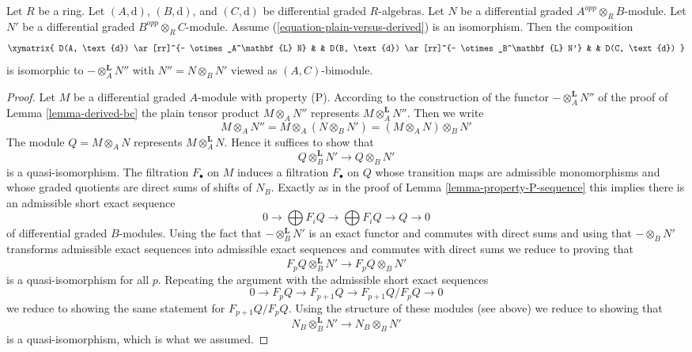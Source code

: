 \begin{lemma}
\label{lemma-compose-tensor-functors-general}
Let $R$ be a ring. Let $(A, \text{d})$, $(B, \text{d})$, and
$(C, \text{d})$ be differential graded $R$-algebras.
Let $N$ be a differential graded $A^{opp} \otimes_R B$-module.
Let $N'$ be a differential graded $B^{opp} \otimes_R C$-module.
Assume (\ref{equation-plain-versus-derived}) is an isomorphism.
Then the composition
$$
\xymatrix{
D(A, \text{d}) \ar[rr]^{- \otimes_A^\mathbf{L} N} & &
D(B, \text{d}) \ar[rr]^{- \otimes_B^\mathbf{L} N'} & &
D(C, \text{d})
}
$$
is isomorphic to $- \otimes_A^\mathbf{L} N''$ with
$N'' = N \otimes_B N'$ viewed as $(A, C)$-bimodule.
\end{lemma}

\begin{proof}
Let $M$ be a differential graded $A$-module with property (P).
According to the construction of the functor $- \otimes_A^\mathbf{L} N''$
of the proof of Lemma \ref{lemma-derived-bc} the plain tensor
product $M \otimes_A N''$ represents $M \otimes_A^\mathbf{L} N''$.
Then we write
$$
M \otimes_A N'' =
M \otimes_A (N \otimes_B N') =
(M \otimes_A N) \otimes_B N'
$$
The module $Q = M \otimes_A N$ represents $M \otimes_A^\mathbf{L} N$.
Hence it suffices to show that
$$
Q \otimes_B^\mathbf{L} N' \longrightarrow Q \otimes_B N'
$$
is a quasi-isomorphism. The filtration $F_\bullet$ on $M$ induces a
filtration $F_\bullet$ on $Q$ whose transition maps are admissible
monomorphisms and whose graded quotients are direct sums of shifts of $N_B$.
Exactly as in the proof of Lemma \ref{lemma-property-P-sequence}
this implies there is an admissible short exact sequence
$$
0 \to
\bigoplus\nolimits F_iQ \to
\bigoplus\nolimits F_iQ \to Q \to 0
$$
of differential graded $B$-modules. Using the fact that
$- \otimes_B^\mathbf{L} N'$ is an exact functor and commutes
with direct sums and using that $- \otimes_B N'$ transforms
admissible exact sequences into admissible exact sequences
and commutes with direct sums we reduce to proving
that
$$
F_pQ \otimes_B^\mathbf{L} N' \longrightarrow F_pQ \otimes_B N'
$$
is a quasi-isomorphism for all $p$. Repeating the argument
with the admissible short exact sequences
$$
0 \to F_pQ \to F_{p + 1}Q \to F_{p + 1}Q/F_pQ \to 0
$$
we reduce to showing the same statement for $F_{p + 1}Q/F_pQ$.
Using the structure of these modules (see above) we reduce to
showing that
$$
N_B \otimes_B^\mathbf{L} N' \longrightarrow N_B \otimes_B N'
$$
is a quasi-isomorphism, which is what we assumed.
\end{proof}

